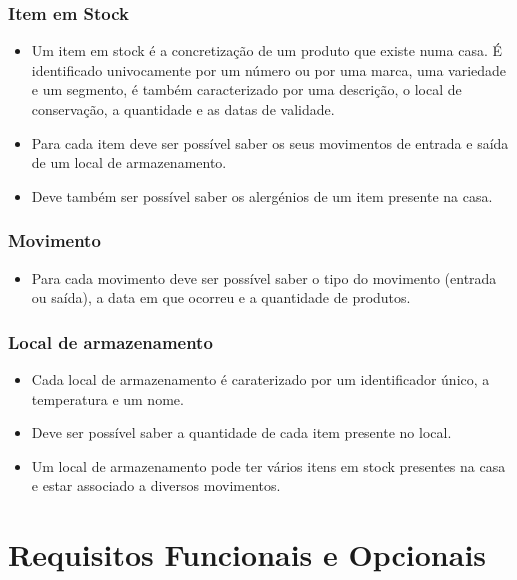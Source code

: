 \subsubsection{Item em Stock}
\begin{itemize}
	\item Um item em stock é a concretização de um produto que existe numa casa. É identificado univocamente por um número ou por uma marca, uma variedade e um segmento, é também caracterizado por uma descrição, o local de conservação, a quantidade e as datas de validade. 
	\item Para cada item deve ser possível saber os seus movimentos de entrada e saída de um local de armazenamento.
	\item Deve também ser possível saber os alergénios de um item presente na casa.
\end{itemize}

\subsubsection{Movimento}
\begin{itemize}
	\item Para cada movimento deve ser possível saber o tipo do movimento (entrada ou saída), a data em que ocorreu e a quantidade de produtos. 
\end{itemize}

\subsubsection{Local de armazenamento}
\begin{itemize}
	\item Cada local de armazenamento é caraterizado por um identificador único, a temperatura e um nome.
	\item Deve ser possível saber a quantidade de cada item presente no local.
	\item Um local de armazenamento pode ter vários itens em stock presentes na casa e estar associado a diversos movimentos.
\end{itemize}


%
%
\section{Requisitos Funcionais e Opcionais} \label{sec22}

